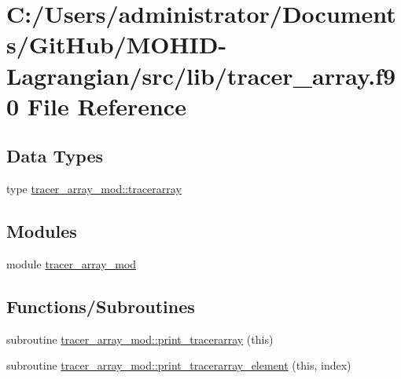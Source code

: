 \hypertarget{tracer__array_8f90}{}\section{C\+:/\+Users/administrator/\+Documents/\+Git\+Hub/\+M\+O\+H\+I\+D-\/\+Lagrangian/src/lib/tracer\+\_\+array.f90 File Reference}
\label{tracer__array_8f90}
\subsection*{Data Types}
\begin{DoxyCompactItemize}
\item 
type \hyperlink{structtracer__array__mod_1_1tracerarray}{tracer\+\_\+array\+\_\+mod\+::tracerarray}
\end{DoxyCompactItemize}
\subsection*{Modules}
\begin{DoxyCompactItemize}
\item 
module \hyperlink{namespacetracer__array__mod}{tracer\+\_\+array\+\_\+mod}
\end{DoxyCompactItemize}
\subsection*{Functions/\+Subroutines}
\begin{DoxyCompactItemize}
\item 
subroutine \hyperlink{namespacetracer__array__mod_a173acbcf343367bf87b705fe5ca0dd29}{tracer\+\_\+array\+\_\+mod\+::print\+\_\+tracerarray} (this)
\item 
subroutine \hyperlink{namespacetracer__array__mod_ac3b3896987e589190c759e92e95e05af}{tracer\+\_\+array\+\_\+mod\+::print\+\_\+tracerarray\+\_\+element} (this, index)
\end{DoxyCompactItemize}

